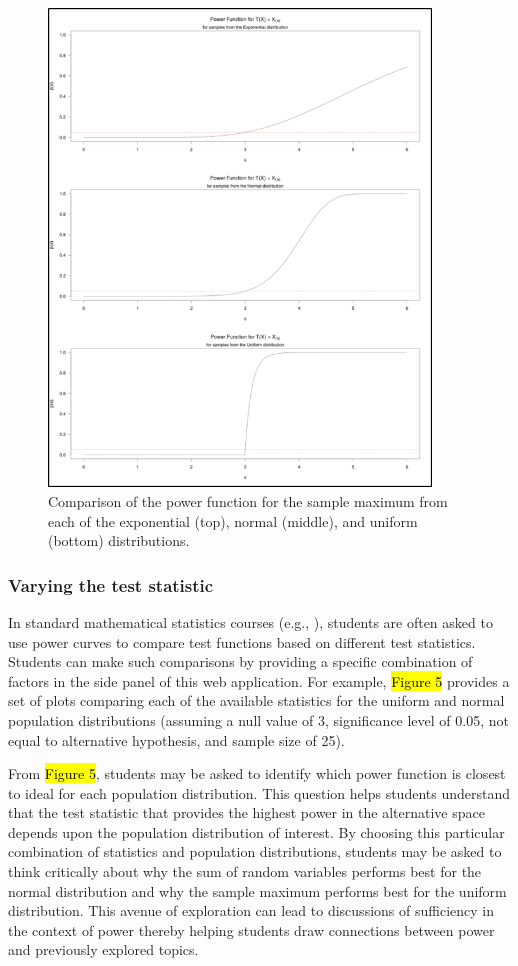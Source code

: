 \documentclass{TISE}
\begin{document}
\begin{figure}[H]
	\centering
	\includegraphics[width=4in]{varypop.png}
	\caption{Comparison of the power function for the sample maximum from each of the exponential (top), normal (middle), and uniform (bottom) distributions.}
\end{figure}

\subsubsection{Varying the test statistic}

In standard mathematical statistics courses (e.g., \cite{casella2002}), students are often asked to use power curves to compare test functions based on different test statistics. Students can make such comparisons by providing a specific combination of factors in the side panel of this web application. For example, \hl{Figure 5} provides a set of plots comparing each of the available statistics for the uniform and normal population distributions (assuming a null value of 3, significance level of 0.05, not equal to alternative hypothesis, and sample size of 25).

From \hl{Figure 5}, students may be asked to identify which power function is closest to ideal for each population distribution. This question helps students understand that the test statistic that provides the highest power in the alternative space depends upon the population distribution of interest. By choosing this particular combination of statistics and population distributions, students may be asked to think critically about why the sum of random variables performs best for the normal distribution and why the sample maximum performs best for the uniform distribution. This avenue of exploration can lead to discussions of sufficiency in the context of power thereby helping students draw connections between power and previously explored topics.  
\end{document}
